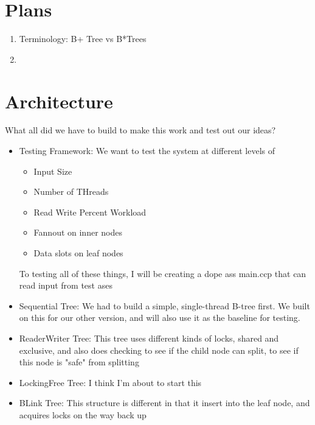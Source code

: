 \documentclass{sig-alternate}
\begin{document}
\section{Plans}
\begin{enumerate}
\item Terminology: B+ Tree vs B*Trees
\item 
\end{enumerate}

\section{Architecture}
What all did we have to build to make this work and test out our ideas?
\begin{itemize}
  \item{Testing Framework:} We want to test the system at different levels of
    \begin{itemize}
      \item Input Size
      \item Number of THreads
      \item Read Write Percent Workload
      \item Fannout on inner nodes
      \item Data slots on leaf nodes
    \end{itemize}
    To testing all of these things, I will be creating a dope ass main.ccp that can read input from test ases
  \item{Sequential Tree:} We had to build a simple, single-thread B-tree first.  We built on this for our other version, and will also use it as the baseline for testing.
  \item{ReaderWriter Tree:} This tree uses different kinds of locks, shared and exclusive, and also does checking to see if the child node can split, to see if this node is "safe" from splitting
  \item{LockingFree Tree:} I think I'm about to start this
  \item{BLink Tree:} This structure is different in that it insert into the leaf node, and acquires locks on the way back up
\end{itemize}
\end{document}
